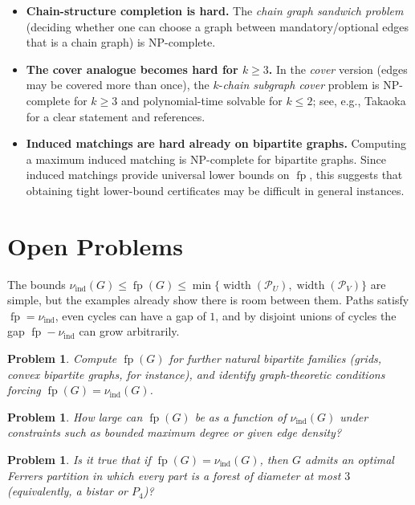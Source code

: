 \documentclass[12pt]{amsart}
\newtheorem{problem}[theorem]{Problem}
\newcommand{\fp}{\operatorname{fp}}
\newcommand{\ind}{\operatorname{ind}}
\newcommand{\width}{\operatorname{width}}
\begin{document}
\begin{itemize}[leftmargin=2em]
\item \textbf{Chain-structure completion is hard.}
The \emph{chain graph sandwich problem} (deciding whether one can choose a graph between mandatory/optional edges
that is a chain graph) is NP-complete. \cite{DantasEtAl2011}

\item \textbf{The cover analogue becomes hard for $k\ge 3$.}
In the \emph{cover} version (edges may be covered more than once),
the $k$-\emph{chain subgraph cover} problem is NP-complete for $k\ge 3$ and polynomial-time solvable for $k\le 2$;
see, e.g., Takaoka for a clear statement and references. \cite{Takaoka2016}

\item \textbf{Induced matchings are hard already on bipartite graphs.}
Computing a maximum induced matching is NP-complete for bipartite graphs. \cite{Cameron1989}
Since induced matchings provide universal lower bounds on $\fp$, this suggests that obtaining tight lower-bound
certificates may be difficult in general instances.
\end{itemize}


\section{Open Problems}

The bounds $\nu_{\ind}(G)\le \fp(G)\le \min\{\width(\mathcal P_U),\width(\mathcal P_V)\}$ are simple, but the examples already show there is room between them.
Paths satisfy $\fp=\nu_{\ind}$, even cycles can have a gap of $1$, and by disjoint unions of cycles the gap $\fp-\nu_{\ind}$ can grow arbitrarily.

\begin{problem}
Compute $\fp(G)$ for further natural bipartite families (grids, convex bipartite graphs, for instance), and identify graph-theoretic conditions forcing $\fp(G)=\nu_{\ind}(G)$.
\end{problem}

\begin{problem}
How large can $\fp(G)$ be as a function of $\nu_{\ind}(G)$ under constraints such as bounded maximum degree or given edge density?
\end{problem}

\begin{problem}
Is it true that if $\fp(G)=\nu_{\ind}(G)$, then $G$ admits an optimal Ferrers partition in which every part is a forest of diameter at most $3$ (equivalently, a bistar or $P_4$)?
\end{problem}
\end{document}

